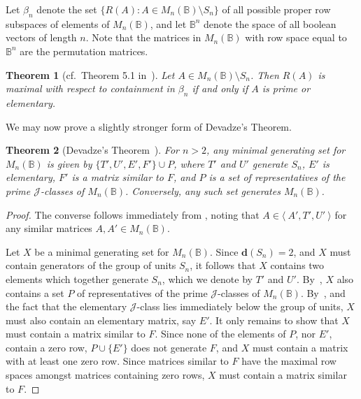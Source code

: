 \documentclass[11pt]{article}
\newtheorem{thm}{Theorem}[subsection]
\numberwithin{equation}{section}
\newcommand{\set}[2]{\ensuremath{\{#1 : #2 \}}}
\newcommand{\genset}[1]{\ensuremath{\langle\: #1 \:\rangle}}
\newcommand{\B}{\mathbb{B}}
\newcommand{\Bn}{M_n(\B)}
\newcommand{\J}{\mathscr{J}}
\begin{document}
Let $\beta_n$ denote the set $\set{R(A)}{A\in \Bn\setminus S_n}$ of all
possible proper row subspaces of elements of $\Bn$, and let $\B^n$ denote
the space of all boolean vectors of length $n$. Note that the matrices in $\Bn$ with row
space equal to $\B^n$ are the permutation matrices.

\begin{thm}[cf.\ Theorem 5.1 in~\cite{Caen1981aa}]
  Let $A \in \Bn\setminus S_n$. Then $R(A)$ is maximal with respect to
  containment in $\beta_n$ if and only if $A$ is prime or elementary.  
\end{thm}

We may now prove a slightly stronger form of Devadze's Theorem.

\begin{thm}[Devadze's Theorem~\cite{Konieczny2011aa}]
  For $n > 2$, any minimal generating set for $\Bn$ is given by $\{T', U', E',
    F'\} \cup P$, where $T'$ and $U'$ generate $S_n$, $E'$ is elementary, $F'$
  is a matrix similar to $F$, and $P$ is a set of representatives of the prime
  $\J$-classes of $\Bn$. Conversely, any such set generates $\Bn$.
\end{thm}
\begin{proof}
  The converse follows immediately from , noting that $A
  \in \genset{A', T', U'}$ for any similar matrices $A, A' \in \Bn$.

  Let $X$ be a minimal generating set for $\Bn$. Since $\mathbf{d}(S_n) = 2$,
  and $X$ must contain generators of the group of units $S_n$, it follows that
  $X$ contains two elements which together generate $S_n$, which we denote by
  $T'$ and $U'$. By~\cite[Lemma 4.2]{Konieczny2011aa}, $X$ also contains a set
  $P$ of representatives of the prime $\J$-classes of $\Bn$. By~\cite[Lemma
  4.5]{Konieczny2011aa}, and the fact that the elementary $\J$-class lies
  immediately below the group of units, $X$ must also contain an elementary
  matrix, say $E'$. It only remains to show that $X$ must contain a matrix
  similar to $F$. Since none of the elements of $P$, nor $E'$, contain a
  zero row, $P \cup \{E'\}$ does not generate $F$, and $X$ must contain a matrix
  with at least one zero row. Since matrices similar to $F$ have the maximal row
  spaces amongst matrices containing zero rows, $X$ must contain a matrix
  similar to $F$.
\end{proof} 

\end{document}
